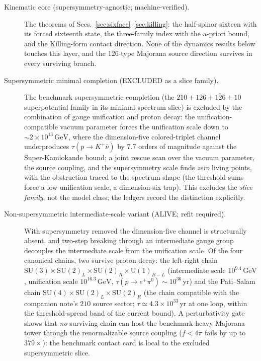 \documentclass[
  aps,
  prd,
  preprint,
  nofootinbib,
  superscriptaddress,
  longbibliography
]{revtex4-2}
\newcommand{\SU}{\mathrm{SU}}
\newcommand{\U}{\mathrm{U}}
\begin{document}
\begin{description}
\item[Kinematic core (supersymmetry-agnostic; machine-verified).]\mbox{}\par
The theorems of Secs.~\ref{sec:sixface}--\ref{sec:killing}: the
half-spinor sixteen with its forced sixteenth state, the three-family
index with the a-priori bound, and the Killing-form contact direction.
None of the dynamics results below touches this layer, and the
\(\overline{126}\)-type Majorana source direction survives in every
surviving branch.

\item[Supersymmetric minimal completion (EXCLUDED as a slice family).]\mbox{}\par
The benchmark supersymmetric completion (the
\(210+126+\overline{126}+10\) superpotential family in its
minimal-spectrum slice) is excluded by the combination of gauge
unification and proton decay: the unification-compatible vacuum
parameter forces the unification scale down to
\(\sim2\times10^{13}\,\mathrm{GeV}\), where the dimension-five
colored-triplet channel underproduces
\(\tau(p\to K^+\bar\nu)\) by \(7.7\) orders of magnitude against the
Super-Kamiokande bound; a joint rescue scan over the vacuum parameter,
the source coupling, and the supersymmetry scale finds \emph{zero}
living points, with the obstruction traced to the spectrum shape (the
threshold sums force a low unification scale, a dimension-six trap).
This excludes the \emph{slice family}, not the model class; the ledgers
record the distinction explicitly.

\item[Non-supersymmetric intermediate-scale variant (ALIVE; refit
required).]\mbox{}\par
With supersymmetry removed the dimension-five channel is structurally
absent, and two-step breaking through an intermediate gauge group
decouples the intermediate scale from the unification scale.  Of the
four canonical chains, two survive proton decay: the left-right chain
\(\SU(3)\times\SU(2)_L\times\SU(2)_R\times\U(1)_{B-L}\)
(intermediate scale \(10^{9.4}\,\mathrm{GeV}\), unification scale
\(10^{16.3}\,\mathrm{GeV}\), \(\tau(p\to e^+\pi^0)\sim10^{36}\,\)yr)
and the Pati--Salam chain \(\SU(4)\times\SU(2)_L\times\SU(2)_R\)
(the chain compatible with the companion note's \(210\) source sector;
\(\tau\simeq4.3\times10^{33}\,\)yr at one loop, within the
threshold-spread band of the current bound).  A perturbativity gate
shows that \emph{no} surviving chain can host the benchmark heavy
Majorana tower through the renormalizable source coupling
(\(f<4\pi\) fails by up to \(379\times\)): the benchmark contact card
is local to the excluded supersymmetric slice.


\end{description}
\end{document}
